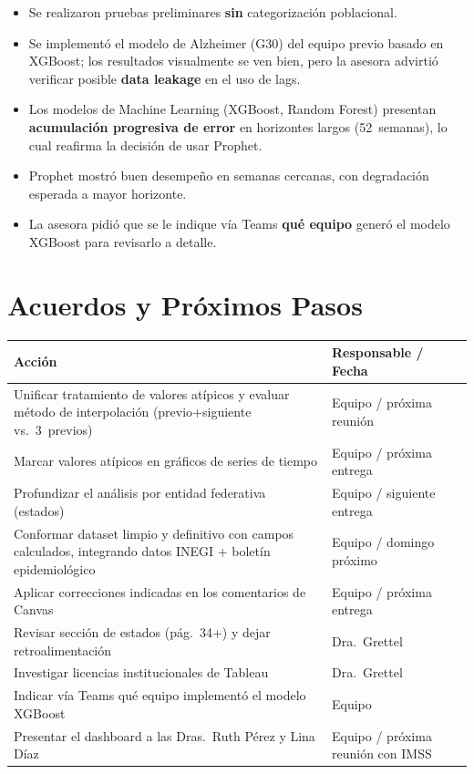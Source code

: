 \documentclass[11pt, a4paper]{article}
\begin{document}
\begin{itemize}[leftmargin=1.5em]
    \item Se realizaron pruebas preliminares \textbf{sin} categorización poblacional.
    \item Se implementó el modelo de Alzheimer (G30) del equipo previo basado en XGBoost; los resultados visualmente se ven bien, pero la asesora advirtió verificar posible \textbf{data leakage} en el uso de lags.
    \item Los modelos de Machine Learning (XGBoost, Random Forest) presentan \textbf{acumulación progresiva de error} en horizontes largos (52~semanas), lo cual reafirma la decisión de usar Prophet.
    \item Prophet mostró buen desempeño en semanas cercanas, con degradación esperada a mayor horizonte.
    \item La asesora pidió que se le indique vía Teams \textbf{qué equipo} generó el modelo XGBoost para revisarlo a detalle.
\end{itemize}

\section{Acuerdos y Próximos Pasos}

\begin{center}
\renewcommand{\arraystretch}{1.4}
\begin{tabular}{@{} >{\raggedright}p{} >{\raggedright\arraybackslash}p{} @{}}
    \toprule
    \textbf{Acción} & \textbf{Responsable / Fecha} \\
    \midrule
    Unificar tratamiento de valores atípicos y evaluar método de interpolación (previo+siguiente vs.\ 3~previos) & Equipo / próxima reunión \\
    Marcar valores atípicos en gráficos de series de tiempo & Equipo / próxima entrega \\
    Profundizar el análisis por entidad federativa (estados) & Equipo / siguiente entrega \\
    Conformar dataset limpio y definitivo con campos calculados, integrando datos INEGI + boletín epidemiológico & Equipo / domingo próximo \\
    Aplicar correcciones indicadas en los comentarios de Canvas & Equipo / próxima entrega \\
    Revisar sección de estados (pág.~34+) y dejar retroalimentación & Dra.\ Grettel \\
    Investigar licencias institucionales de Tableau & Dra.\ Grettel \\
    Indicar vía Teams qué equipo implementó el modelo XGBoost & Equipo \\
    Presentar el dashboard a las Dras.\ Ruth Pérez y Lina Díaz & Equipo / próxima reunión con IMSS \\
    \bottomrule
\end{tabular}
\end{center}
\end{document}
